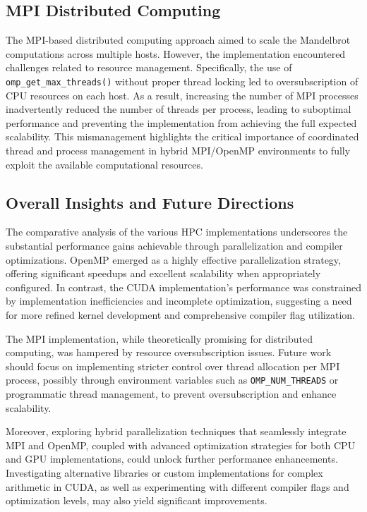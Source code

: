 \documentclass[
	report, %
	11pt, %
]{CSUniSchoolLabReport}
\newcounter{ct}
\begin{document}
\subsection{MPI Distributed Computing}

The MPI-based distributed computing approach aimed to scale the Mandelbrot computations across multiple hosts. However, the implementation encountered challenges related to resource management. Specifically, the use of \texttt{omp\_get\_max\_threads()} without proper thread locking led to oversubscription of CPU resources on each host. As a result, increasing the number of MPI processes inadvertently reduced the number of threads per process, leading to suboptimal performance and preventing the implementation from achieving the full expected scalability. This mismanagement highlights the critical importance of coordinated thread and process management in hybrid MPI/OpenMP environments to fully exploit the available computational resources.

\subsection{Overall Insights and Future Directions}

The comparative analysis of the various HPC implementations underscores the substantial performance gains achievable through parallelization and compiler optimizations. OpenMP emerged as a highly effective parallelization strategy, offering significant speedups and excellent scalability when appropriately configured. In contrast, the CUDA implementation's performance was constrained by implementation inefficiencies and incomplete optimization, suggesting a need for more refined kernel development and comprehensive compiler flag utilization.

The MPI implementation, while theoretically promising for distributed computing, was hampered by resource oversubscription issues. Future work should focus on implementing stricter control over thread allocation per MPI process, possibly through environment variables such as \texttt{OMP\_NUM\_THREADS} or programmatic thread management, to prevent oversubscription and enhance scalability.

Moreover, exploring hybrid parallelization techniques that seamlessly integrate MPI and OpenMP, coupled with advanced optimization strategies for both CPU and GPU implementations, could unlock further performance enhancements. Investigating alternative libraries or custom implementations for complex arithmetic in CUDA, as well as experimenting with different compiler flags and optimization levels, may also yield significant improvements.
\end{document}
